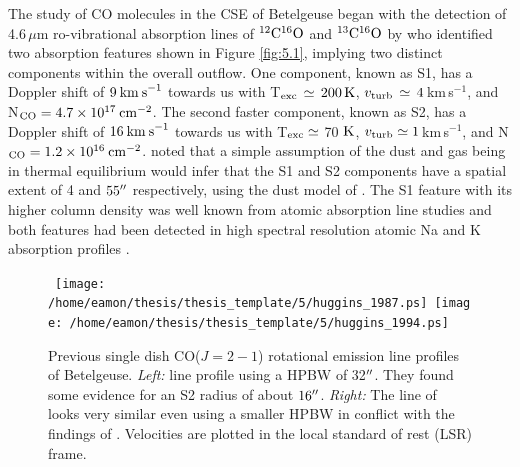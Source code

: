 The study of CO molecules in the CSE of Betelgeuse began with the detection of 4.6\,$\mu$m ro-vibrational absorption lines of $\rm{{}^{12}C^{16}O}$ and $\rm{{}^{13}C^{16}O}$ by \cite{bernat_1979} who identified two absorption features shown in Figure \ref{fig:5.1}, implying two distinct components within the overall outflow. One component, known as S1, has a Doppler shift of $9\>{\rm km\>s}^{-1}$ towards us with T$_{\rm{exc}}\,\simeq\,200\,\rm{K}$, $v_{\rm{turb}}\,\simeq\,4$\,km\,s${}^{-1}$, and N$_{\rm{CO}}=4.7\times 10^{17}\>{\rm cm}^{-2}$. The second faster component, known as S2, has a Doppler shift of $16\>{\rm km\>s}^{-1}$ towards us with T$_{\rm{exc}} \simeq$ 70 $\rm{K}$, $v_{\rm{turb}}\simeq 1$\,km\,s${}^{-1}$, and N$_{\rm{CO}}=1.2\times 10^{16}\>{\rm cm}^{-2}$. \cite{bernat_1979} noted that a simple assumption of the dust and gas being in thermal equilibrium would infer that the S1 and S2 components have a spatial extent of 4 and $55^{\prime\prime}$ respectively, using the dust model of \cite{tsuji_1979}. The S1 feature with its higher column density was well known from atomic absorption line studies \citep[e.g.][]{weymann_1962} and both features had been detected in high spectral resolution atomic Na and K absorption profiles \citep{goldberg_1975}.

\begin{figure}[!ht]
\centering 
\mbox{
          \texttt{[image: /home/eamon/thesis/thesis\_template/5/huggins\_1987.ps]}
          \texttt{[image: /home/eamon/thesis/thesis\_template/5/huggins\_1994.ps]}
          }
\caption[Previous CO$J= 2-1$ rotational emission line profiles]{Previous single dish CO($J= 2-1$) rotational emission line profiles of Betelgeuse. \textit{Left:} \cite{huggins_1987} line profile using a HPBW of 32$^{\prime\prime}$. They found some evidence for an S2 radius of about $16^{\prime\prime}$. \textit{Right:} The line of \cite{huggins_1994} looks very similar even using a smaller HPBW in conflict with the findings of \cite{huggins_1987}. Velocities are plotted in the local standard of rest (LSR) frame.}
\label{fig:5.2}
\end{figure}

